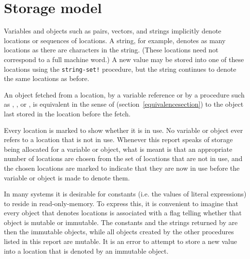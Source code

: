 \section{Storage model}
\label{storagemodel}

Variables and objects such as pairs, vectors, and strings implicitly
denote locations or sequences of locations.  A string, for
example, denotes as many locations as there are characters in the string. 
(These locations need not correspond to a full machine word.) A new value may be
stored into one of these locations using the {\tt string-set!} procedure, but
the string continues to denote the same locations as before.

An object fetched from a location, by a variable reference or by
a procedure such as , , or , is
equivalent in the sense of  (section~\ref{equivalencesection})
to the object last stored in the location before the fetch.

Every location is marked to show whether it is in use.
No variable or object ever refers to a location that is not in use.
Whenever this report speaks of storage being allocated for a variable
or object, what is meant is that an appropriate number of locations are
chosen from the set of locations that are not in use, and the chosen
locations are marked to indicate that they are now in use before the variable
or object is made to denote them.

In many systems it is desirable for constants (i.e. the values of
literal expressions) to reside in read-only-memory.  To express this, it is
convenient to imagine that every object that denotes locations is associated
with a flag telling whether that object is mutable or
immutable.  The constants and the strings returned by
 are then the immutable objects, while all objects created by
the other procedures listed in this report are mutable.  It is an error to
attempt to store a new value into a location that is denoted by an immutable
object.
